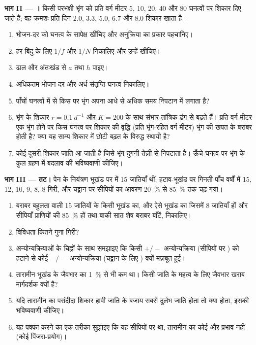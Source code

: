 \begin{problem}
\medskip
\noindent\textbf{भाग II --- ।}
किसी परभक्षी भृंग को प्रति वर्ग मीटर 5, 10, 20, 40 और 80 घनत्वों पर
शिकार दिए जाते हैं; वह क्रमशः प्रति दिन 2.0, 3.3, 5.0, 6.7 और 8.0 शिकार
खाता है।
\begin{enumerate}[resume]
  \item भोजन-दर को घनत्व के सापेक्ष खींचिए और अनुक्रिया का प्रकार
        पहचानिए।
  \item हर बिंदु के लिए $1/f$ और $1/N$ निकालिए और उन्हें खींचिए।
  \item ढाल और अंतःखंड से $a$ तथा $h$ पाइए।
  \item अधिकतम भोजन-दर और अर्ध-संतृप्ति घनत्व निकालिए।
  \item पाँचों घनत्वों में से किस पर भृंग अपना आधे से अधिक समय निपटान
        में लगाता है?
  \item भृंग के शिकार $r = \qty{0.1}{d^{-1}}$ और
        $K = 200$ के साथ संभार-तांत्रिक ढंग से बढ़ते हैं। प्रति वर्ग
        मीटर एक भृंग होने पर किस घनत्व पर शिकार की वृद्धि (प्रति
        भृंग-रहित वर्ग मीटर) भृंग की खपत के बराबर होती है? क्या यह
        साम्य शिकार में छोटी बढ़त के विरुद्ध स्थायी है?
  \item कोई दूसरी शिकार-जाति आ जाती है जिसे भृंग दुगनी तेज़ी से निपटाता
        है। ऊँचे घनत्व पर भृंग के कुल ग्रहण में बदलाव की भविष्यवाणी
        कीजिए।
\end{enumerate}

\medskip
\noindent\textbf{भाग III --- तट।}
पेन के नियंत्रण भूखंड पर  में 15 जातियाँ थीं; हटाव-भूखंड पर गिनती
पाँच वर्षों में 15, 12, 10, 9, 8, 8 गिरी, और चट्टान पर सीपियों का आवरण
\qty{20}{\%} से \qty{85}{\%} तक चढ़ गया।
\begin{enumerate}[resume]
  \item बराबर बहुलता वाली 15 जातियों के किसी भूखंड का, और ऐसे भूखंड का
        जिसमें 8 जातियाँ हों और सीपियाँ प्राणियों की \qty{85}{\%} हों
        तथा बाकी सात शेष बराबर बाँटें,  निकालिए।
  \item विविधता कितने गुना गिरी?
  \item अन्योन्यक्रियाओं के चिह्नों के साथ समझाइए कि किसी
        $+/-$ अन्योन्यक्रिया (सीपियों पर ) को हटाने से कोई $-/-$
        अन्योन्यक्रिया (चट्टान के लिए ) क्यों मज़बूत हुई।
  \item तारामीन भूखंड के जैवभार का \qty{1}{\%} से भी कम था। किसी जाति
        के महत्व के लिए जैवभार खराब मार्गदर्शक क्यों है?
  \item यदि तारामीन का पसंदीदा शिकार हावी जाति के बजाय सबसे दुर्लभ जाति
        होता तो क्या होता, इसकी भविष्यवाणी कीजिए।
  \item यह पक्का करने का एक तरीका सुझाइए कि यह सीपियों पर  था,
        तारामीन का कोई और प्रभाव नहीं (कोई पिंजरा-प्रयोग)।
\end{enumerate}


\end{problem}
